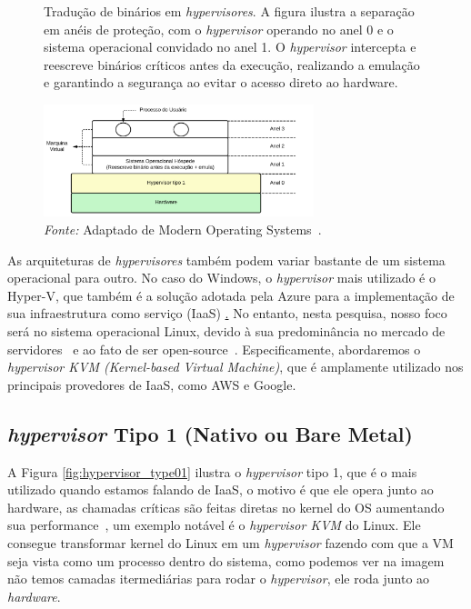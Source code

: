 \begin{figure}[htbp]
  \centering
  \caption{Tradução de binários em \textit{hypervisores}. A figura ilustra a separação em anéis de proteção, com o \textit{hypervisor} operando no anel 0 e o sistema operacional convidado no anel 1. O \textit{hypervisor} intercepta e reescreve binários críticos antes da execução, realizando a emulação e garantindo a segurança ao evitar o acesso direto ao hardware.}
  \includegraphics[width=0.7\textwidth]{images/BinaryTranslate.png}
  \caption*{\textit{Fonte:} Adaptado de Modern Operating Systems~\citep{modernOS}.}
  \label{fig:binary_translate}
\end{figure}


As arquiteturas de \textit{hypervisores} também podem variar bastante de um sistema operacional para outro. No caso do Windows, o \textit{hypervisor} mais utilizado é o Hyper-V, que também é a solução adotada pela Azure para a implementação de sua infraestrutura como serviço (IaaS) \href{https://learn.microsoft.com/pt-br/azure/architecture/reference-architectures/n-tier/high-security-iaas}. No entanto, nesta pesquisa, nosso foco será no sistema operacional Linux, devido à sua predominância no mercado de servidores~\citep{OperationSystemMarketVolume} e ao fato de ser open-source~\citep{WhyUseLinux}. Especificamente, abordaremos o \textit{hypervisor KVM (Kernel-based Virtual Machine)}, que é amplamente utilizado nos principais provedores de IaaS, como AWS e Google.


\subsection{\textit{hypervisor} Tipo 1 (Nativo ou Bare Metal)}

A Figura \ref{fig:hypervisor_type01} ilustra o \textit{hypervisor} tipo 1, que é o mais utilizado quando estamos falando de IaaS, o motivo é que ele opera junto ao hardware, as chamadas críticas são feitas diretas no kernel do OS aumentando sua performance~\citep{chirammal2016mastering}, um exemplo notável é o \textit{hypervisor KVM} do Linux. Ele consegue transformar kernel do Linux em um \textit{hypervisor} fazendo com que a VM seja vista como um processo dentro do sistema, como podemos ver na imagem não temos camadas itermediárias para rodar o \textit{hypervisor}, ele roda junto ao \textit{hardware}.


